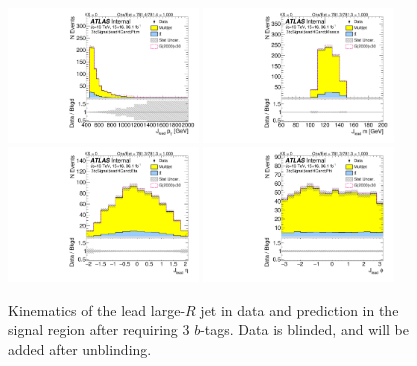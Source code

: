\clearpage

\begin{figure}[htbp!]
\begin{center}
\includegraphics[angle=270, width=0.45\textwidth]{./figures/boosted/Signal/b77_ThreeTag_Signal_leadHCand_Pt_m_blind.pdf}
\includegraphics[angle=270, width=0.45\textwidth]{./figures/boosted/Signal/b77_ThreeTag_Signal_leadHCand_Mass_s_blind.pdf}\\
\includegraphics[angle=270, width=0.45\textwidth]{./figures/boosted/Signal/b77_ThreeTag_Signal_leadHCand_Eta_blind.pdf}
\includegraphics[angle=270, width=0.45\textwidth]{./figures/boosted/Signal/b77_ThreeTag_Signal_leadHCand_Phi_blind.pdf}
  \caption{Kinematics of the lead large-$R$ jet in data and prediction in the signal region after requiring 3 $b$-tags. Data is blinded, and will be added after unblinding.}
  \label{fig:boosted-3b-signal-blind-ak10-lead}
\end{center}
\end{figure}

